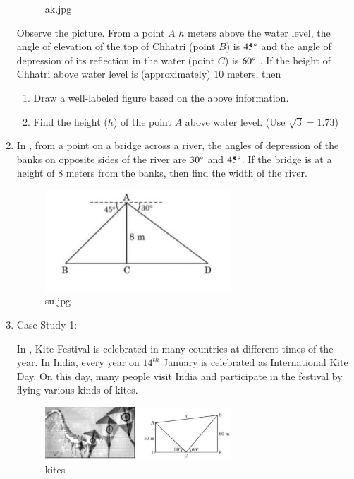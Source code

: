 \begin{enumerate}
\begin{figure}[H]
        \caption{ak.jpg}
        \label{fig:ak}
    \end{figure}
    Observe the picture. From a point $A$ $h$ meters above the water level, the angle of elevation of the top of Chhatri (point $B$) is $45\degree$ and the angle of depression of its reflection in the water (point $C$) is $60\degree$ . If the height of Chhatri above water level is (approximately) $10$ meters, then 
    \begin{enumerate}
        \item Draw a well-labeled figure based on the above information.
        \item Find the height ($h$) of the point $A$ above water level. (Use $\sqrt{3}=1.73$) 
    \end{enumerate}

    \hfill{}\item In , from a point on a bridge across a river, the angles of depression of the banks on opposite sides of the river are $30\degree$ and $45\degree$. If the bridge is at a height of $8$ meters from the banks, then find the width of the river.
    \begin{figure}[H]
        \centering
        \includegraphics[width=70mm]{cbse-math/figs/su.jpeg}
        \caption{su.jpg}
        \label{fig:su.jpeg}
    \end{figure}
    
    \hfill{}\item Case Study-1:
    
    In , Kite Festival is celebrated in many countries at different times of the year. In India, every year on $14^{th}$ January is celebrated as International Kite Day. On this day, many people visit India and participate in the festival by flying various kinds of kites.
    
    \begin{figure}[H]
	\centering
        \includegraphics[width=70mm]{cbse-math/figs/kite.jpeg}
        \caption{kites}
        \label{fig:kite.jpeg}
    \end{figure}
    

\end{enumerate}
